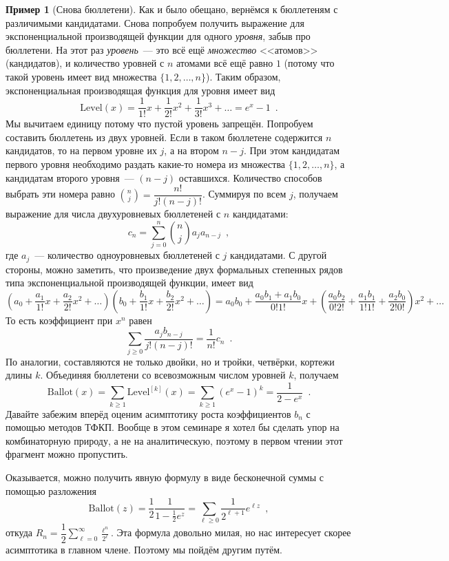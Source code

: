 \documentclass{article}
\theoremstyle{definition}
\newtheorem{example}{Пример}
\begin{document}
\begin{example}[Снова бюллетени]
Как и было обещано, вернёмся к бюллетеням с различимыми кандидатами. Снова 
попробуем получить выражение для экспоненциальной производящей функции для 
одного \textit{уровня}, забыв про бюллетени. На этот 
раз \textit{уровень}~--- это всё ещё \textit{множество} <<атомов>> 
(кандидатов), и количество уровней с \( n \) атомами всё ещё равно \( 1 \) 
(потому что такой уровень имеет вид множества \( \{1, 2, \ldots, n\} \)). Таким 
образом, экспоненциальная производящая функция для уровня имеет вид
\[
	\mathrm{Level} (x) = \dfrac{1}{1!} x + \dfrac{1}{2!} x^2 + \dfrac{1}{3!}x^3 
	+ \ldots = e^x - 1
	\enspace .
\]
Мы вычитаем единицу потому что пустой уровень запрещён.
Попробуем составить бюллетень из двух уровней. Если в таком бюллетене 
содержится \( n \) кандидатов, то на первом уровне их \( j \), а на втором \( 
n-j \). При этом кандидатам первого уровня необходимо раздать какие-то номера 
из множества \( \{1, 2, \ldots, n\} \), а кандидатам второго уровня~--- \( 
(n-j) \) оставшихся. Количество способов выбрать эти номера равно \( {n \choose 
j} = \dfrac{n!}{j! (n-j)!} \). Суммируя по всем \( j \), получаем выражение для 
числа двухуровневых бюллетеней с \( n \) кандидатами:
\[
	c_n = \sum_{j=0}^{n} {n \choose j} a_j a_{n-j} \enspace ,
\]
где \( a_j \)~--- количество одноуровневых бюллетеней с \( j \) кандидатами. С 
другой стороны, можно заметить, что произведение двух формальных степенных 
рядов типа экспоненциальной производящей функции, имеет вид
\[
	(a_0 + \dfrac{a_1}{1!}x + \dfrac{a_2}{2!}x^2 + \ldots)
	(b_0 + \dfrac{b_1}{1!}x + \dfrac{b_2}{2!}x^2 + \ldots)
	= 
	a_0 b_0 + \dfrac{a_0 b_1 + a_1 b_0}{0!1!} x + 
	\left(\dfrac{a_0 b_2}{0!2!} + \dfrac{a_1b_1}{1!1!} + \dfrac{a_2 
	b_0}{2!0!}\right)x^2 + \ldots
\]
То есть коэффициент при \( x^n \) равен
\[
	\sum_{j \geq 0} \dfrac{a_j b_{n-j}}{j! (n-j)!} = \dfrac{1}{n!} c_n
	\enspace .
\]
По аналогии, составляются не только двойки, но и тройки, четвёрки, кортежи 
длины \( k \). Объединяя бюллетени со всевозможным числом уровней \( k \), 
получаем
\[
	\mathrm{Ballot}(x) = \sum_{k \geq 1} \mathrm{Level}^{[k]}(x) = \sum_{k \geq 
	1} (e^{x} - 1)^k = \dfrac{1}{2 - e^x} \enspace .
\]
Давайте забежим вперёд оценим асимптотику роста коэффициентов \( b_n \) с 
помощью методов ТФКП. Вообще в этом семинаре я хотел бы сделать упор на 
комбинаторную природу, а не на аналитическую, поэтому в первом чтении этот 
фрагмент можно пропустить.

Оказывается, можно получить явную формулу в виде бесконечной суммы с помощью 
разложения
\[
	\mathrm{Ballot}(z) = \dfrac{1}{2} \dfrac{1}{1 - \tfrac12 e^{z}} = 
	\sum_{\ell \geq 0} 
	\dfrac{1}{2^{\ell + 1}} e^{\ell z} \enspace ,
\]
откуда \( R_n = \dfrac{1}{2} \sum_{\ell = 0}^{\infty} \tfrac{\ell^n}{2^\ell} 
\). Эта формула довольно милая, но нас интересует скорее асимптотика в главном 
члене. Поэтому мы пойдём другим путём.


\end{example}
\end{document}
